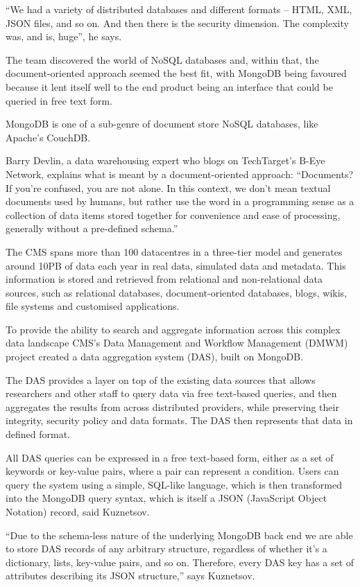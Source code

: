 ``We had a variety of distributed databases and different formats – HTML, XML, JSON files, and so on. And then there is the security dimension. The complexity was, and is, huge'', he says.

The team discovered the world of NoSQL databases and, within that, the document-oriented approach seemed the best fit, with MongoDB being favoured because it lent itself well to the end product being an interface that could be queried in free text form.

MongoDB is one of a sub-genre of document store NoSQL databases, like Apache’s CouchDB. 

Barry Devlin, a data warehousing expert who blogs on TechTarget’s B-Eye Network, explains what is meant by a document-oriented approach: ``Documents? If you're confused, you are not alone. In this context, we don't mean textual documents used by humans, but rather use the word in a programming sense as a collection of data items stored together for convenience and ease of processing, generally without a pre-defined schema.''

The CMS spans more than 100 datacentres in a three-tier model and generates around 10PB of data each year in real data, simulated data and metadata. This information is stored and retrieved from relational and non-relational data sources, such as relational databases, document-oriented databases, blogs, wikis, file systems and customised applications.

To provide the ability to search and aggregate information across this complex data landscape CMS's Data Management and Workflow Management (DMWM) project created a data aggregation system (DAS), built on MongoDB. 

The DAS provides a layer on top of the existing data sources that allows researchers and other staff to query data via free text-based queries, and then aggregates the results from across distributed providers, while preserving their integrity, security policy and data formats. The DAS then represents that data in defined format.

All DAS queries can be expressed in a free text-based form, either as a set of keywords or key-value pairs, where a pair can represent a condition. Users can query the system using a simple, SQL-like language, which is then transformed into the MongoDB query syntax, which is itself a JSON (JavaScript Object Notation) record, said Kuznetsov.

``Due to the schema-less nature of the underlying MongoDB back end we are able to store DAS records of any arbitrary structure, regardless of whether it's a dictionary, lists, key-value pairs, and so on. Therefore, every DAS key has a set of attributes describing its JSON structure,'' says Kuznetsov.

